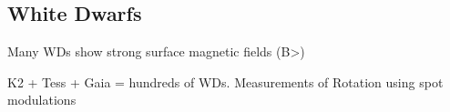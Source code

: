 {\color{red} \subsection{White Dwarfs}}
Many WDs show strong surface magnetic fields (B>)

K2 + Tess + Gaia = hundreds of WDs. Measurements of Rotation using spot modulations